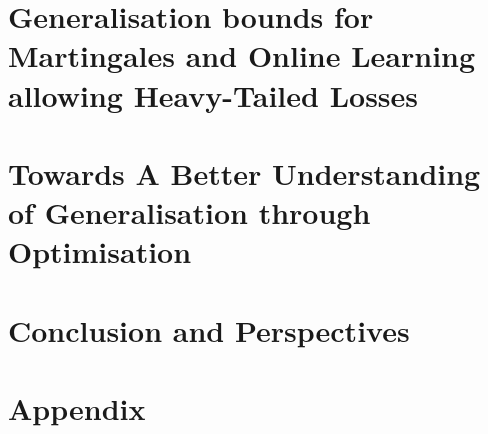 \documentclass{thesis}
\begin{document}




\part[Generalisation bounds for  Martingales and Online Learning allowing Heavy-Tailed Losses]{Generalisation bounds for  Martingales and Online Learning allowing Heavy-Tailed Losses}
\label{part:contrib-pac-bayes}





\part[Towards A Better Understanding of Generalisation through Optimisation]{Towards A Better Understanding of Generalisation through Optimisation}

\label{part:contrib-disintegrated}





\part{Conclusion and Perspectives}
\label{part:conclusion}

%


\appendix
\part{Appendix}



%
%
%
%
%
%

\newrefcontext[sorting=nyt]
\printbibliography[filter={references}, title={References}]


\newpage
\pagestyle{empty}
\strictpagecheck
\checkoddpage
\ifoddpage
~\newpage
\fi

\end{document}
